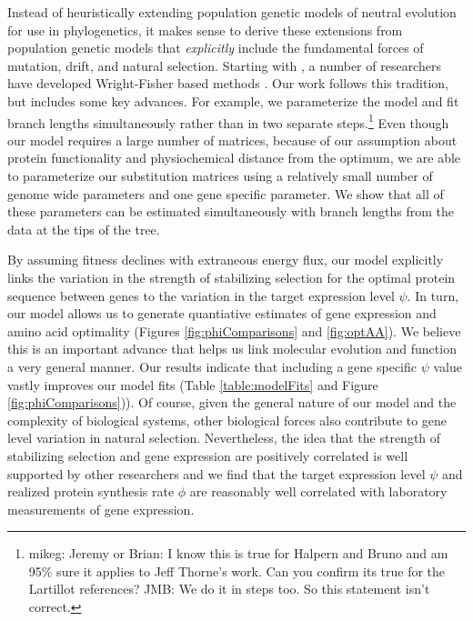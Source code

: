 \documentclass{article}
\begin{document}
Instead of heuristically extending population genetic models of neutral evolution for use in phylogenetics, it makes sense to derive these extensions from population genetic models that \emph{explicitly} include the fundamental forces of mutation, drift, and natural selection. %
Starting with \citet{HalpernAndBruno1998}, a number of researchers have developed Wright-Fisher based methods \citep[e.g.~][]{KoshiEtAl1999,DimmicEtAl2000,KoshiAndGoldstein2001,RobinsonEtAl2003,LartillotAndPhilippe2004,ThorneEtAl2012,RodrigueAndLartillot2014}.%
Our work follows this tradition, but includes some key advances.
For example, we parameterize the model and fit branch lengths simultaneously rather than in two separate steps.\footnote{mikeg: Jeremy or Brian: I know this is true for Halpern and Bruno and am 95\% sure it applies to Jeff Thorne's work.
        Can you confirm its true for the Lartillot references? JMB: We do it in steps too. So this statement isn't correct.}
 Even though our model requires a large number of matrices, because of our assumption about protein functionality and physiochemical distance from the optimum, we are able to parameterize our substitution matrices using a relatively small number of genome wide parameters and one gene specific parameter.
      We show that all of these parameters can be estimated simultaneously with branch lengths from the data at the tips of the tree.

      By assuming fitness declines with extraneous energy flux, our model explicitly links the variation in the strength of stabilizing selection for the optimal protein sequence between genes to the variation in the target expression level $\psi$.
      In turn, our model allows us to generate quantiative estimates of gene expression and amino acid optimality (Figures \ref{fig:phiComparisons} and \ref{fig:optAA}).
      We believe this is an important advance that helps us link molecular evolution and function a very general manner.
      Our results indicate that including a gene specific $\psi$ value vastly improves our model fits (Table \ref{table:modelFits} and Figure \ref{fig:phiComparisons})).
      Of course, given the general nature of our model and the complexity of biological systems, other biological forces also contribute to gene level variation in natural selection.
      Nevertheless, the idea that the strength of stabilizing selection and gene expression are positively correlated is well supported by other researchers \citep[e.g.][]{DrummondEtAl2005} and we find that the target expression level $\psi$ and realized protein synthesis rate $\phi$ are reasonably well correlated with laboratory measurements of gene expression.
\end{document}
